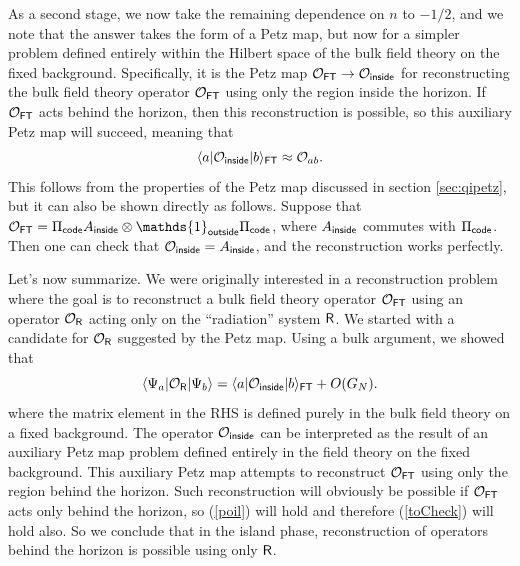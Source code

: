\documentclass[12pt]{article}
\newcommand{\be}{\begin{equation}}
\newcommand{\ee}{\end{equation}}
\numberwithin{equation}{section}
\begin{document}
As a second stage, we now take the remaining dependence on $n$ to $-1/2$, and we note that the answer takes the form of a Petz map, but now for a simpler problem defined entirely within the Hilbert space of the bulk field theory on the fixed background. Specifically, it is the Petz map $\mathcal{O}_{\sf{FT}}\rightarrow \mathcal{O}_{\sf{inside}}$ for reconstructing the bulk field theory operator $\mathcal{O}_{\sf{FT}}$ using only the region inside the horizon. If $\mathcal{O}_{\sf{FT}}$ acts behind the horizon, then this reconstruction is possible, so this auxiliary Petz map will succeed, meaning that
\be
\langle a|\mathcal{O}_{\sf{inside}}|b\rangle_{\sf{FT}} \approx  \mathcal{O}_{ab}.\label{poil}
\ee
This follows from the properties of the Petz map discussed in section \ref{sec:qipetz}, but it can also be shown directly as follows. Suppose that $\mathcal{O}_{\sf{FT}} = \Pi_{\sf{code}}A_{\sf{inside}}\otimes \mathds{1}_{\sf{outside}}\Pi_{\sf{code}}$, where $A_{\sf{inside}}$ commutes with $\Pi_{\sf{code}}$. Then one can check that $\mathcal{O}_{\sf{inside}} = A_{\sf{inside}}$, and the reconstruction works perfectly.

Let's now summarize. We were originally interested in a reconstruction problem where the goal is to reconstruct a bulk field theory operator $\mathcal{O}_{\sf{FT}}$ using an operator $\mathcal{O}_{\sf{R}}$ acting only on the ``radiation'' system $\sf{R}$. We started with a candidate for $\mathcal{O}_{\sf{R}}$ suggested by the Petz map. Using a bulk argument, we showed that
\be
\langle \Psi_a|\mathcal{O}_{\sf{R}}|\Psi_b\rangle = \langle a|\mathcal{O}_{\sf{inside}}|b\rangle_{\sf{FT}} + O(G_N).
\ee
where the matrix element in the RHS is defined purely in the bulk field theory on a fixed background. The operator $\mathcal{O}_{\sf{inside}}$ can be interpreted as the result of an auxiliary Petz map problem defined entirely in the field theory on the fixed background. This auxiliary Petz map attempts to reconstruct $\mathcal{O}_{\sf{FT}}$ using only the region behind the horizon. Such reconstruction will obviously be possible if $\mathcal{O}_{\sf{FT}}$ acts only behind the horizon, so (\ref{poil}) will hold and therefore (\ref{toCheck}) will hold also. So we conclude that in the island phase, reconstruction of operators behind the horizon is possible using only $\sf{R}$.
\end{document}

